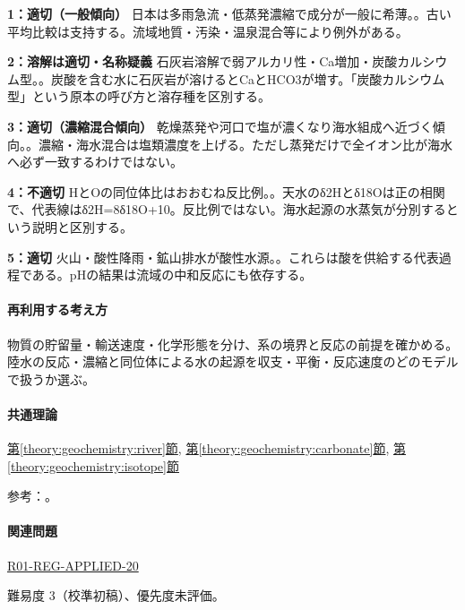 \noindent\textbf{1：適切（一般傾向）} 日本は多雨急流・低蒸発濃縮で成分が一般に希薄。。古い平均比較は支持する。流域地質・汚染・温泉混合等により例外がある。\par

\noindent\textbf{2：溶解は適切・名称疑義} 石灰岩溶解で弱アルカリ性・Ca増加・炭酸カルシウム型。。炭酸を含む水に石灰岩が溶けるとCaとHCO3が増す。「炭酸カルシウム型」という原本の呼び方と溶存種を区別する。\par

\noindent\textbf{3：適切（濃縮混合傾向）} 乾燥蒸発や河口で塩が濃くなり海水組成へ近づく傾向。。濃縮・海水混合は塩類濃度を上げる。ただし蒸発だけで全イオン比が海水へ必ず一致するわけではない。\par

\noindent\textbf{4：不適切} HとOの同位体比はおおむね反比例。。天水のδ2Hとδ18Oは正の相関で、代表線はδ2H=\allowbreak{}8δ18O+10。反比例ではない。海水起源の水蒸気が分別するという説明と区別する。\par

\noindent\textbf{5：適切} 火山・酸性降雨・鉱山排水が酸性水源。。これらは酸を供給する代表過程である。pHの結果は流域の中和反応にも依存する。\par

\paragraph{再利用する考え方} 物質の貯留量・輸送速度・化学形態を分け、系の境界と反応の前提を確かめる。陸水の反応・濃縮と同位体による水の起源を収支・平衡・反応速度のどのモデルで扱うか選ぶ。

\paragraph{共通理論} \hyperref[theory:geochemistry:river]{第\ref*{theory:geochemistry:river}節}, \hyperref[theory:geochemistry:carbonate]{第\ref*{theory:geochemistry:carbonate}節}, \hyperref[theory:geochemistry:isotope]{第\ref*{theory:geochemistry:isotope}節}

\par 参考：\cite{gc_river1970,gc_hem,gc_meteoric}。

\paragraph{関連問題} \hyperref[q:r01-reg-applied-20]{R01-REG-APPLIED-20}

\par 難易度 3（校準初稿）、優先度未評価。

